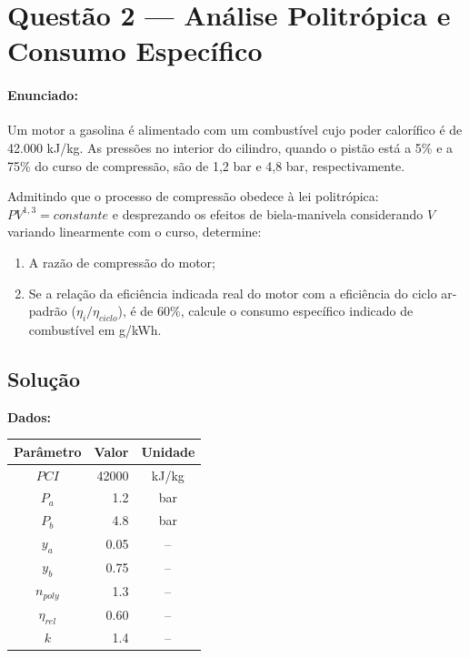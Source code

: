 \newpage
\section*{Questão 2 — Análise Politrópica e Consumo Específico}
\label{sec:q_2}
\vspace{{10pt}}
\begin{{minipage}}{{\textwidth}}
\small
\paragraph{{Enunciado:}}
\begin{{verbatim}}
Um motor a gasolina é alimentado com um combustível cujo poder calorífico é de 42.000 kJ/kg. 
As pressões no interior do cilindro, quando o pistão está a 5\% e a 75\% do curso de compressão, 
são de 1,2 bar e 4,8 bar, respectivamente.

Admitindo que o processo de compressão obedece à lei politrópica: $PV^{1,3} = constante$ 
e desprezando os efeitos de biela-manivela considerando $V$ variando linearmente com o curso, determine:
\begin{enumerate}[label=\alph*)]
\item A razão de compressão do motor;
\item Se a relação da eficiência indicada real do motor com a eficiência do ciclo ar-padrão ($\eta_i/\eta_{ciclo}$), 
é de 60\%, calcule o consumo específico indicado de combustível em g/kWh.
\end{enumerate}

\end{{verbatim}}
\end{{minipage}}
\vspace{{15pt}}
\subsection*{Solução}
\noindent\textbf{Dados:}\\[5pt]
\begin{center}
\begin{tabular}{|c|r|c|} \hline
\textbf{Parâmetro} & \textbf{Valor} & \textbf{Unidade} \\ \hline\hline
$PCI$ & 42000 & kJ/kg \\ \hline
$P_a$ & 1.2 & bar \\ \hline
$P_b$ & 4.8 & bar \\ \hline
$y_a$ & 0.05 & -- \\ \hline
$y_b$ & 0.75 & -- \\ \hline
$n_{poly}$ & 1.3 & -- \\ \hline
$\eta_{rel}$ & 0.60 & -- \\ \hline
$k$ & 1.4 & -- \\ \hline
\end{tabular}
\end{center}\\[10pt]

